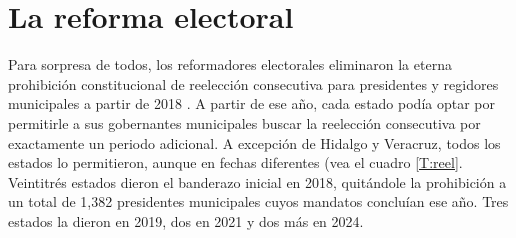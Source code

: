 \documentclass[letter,12pt]{article}
\begin{document}
\section{La reforma electoral} 

Para sorpresa de todos, los reformadores electorales eliminaron la eterna prohibición constitucional de reelección consecutiva para presidentes y regidores municipales a partir de 2018 \citep{magar.el.dataset.2026}. A partir de ese año, cada estado podía optar por permitirle a sus gobernantes municipales buscar la reelección consecutiva por exactamente un periodo adicional. A excepción de Hidalgo y Veracruz, todos los estados lo permitieron, aunque en fechas diferentes (vea el cuadro \ref{T:reel}. Veintitrés estados dieron el banderazo inicial en 2018, quitándole la prohibición a un total de 1,382 presidentes municipales cuyos mandatos concluían ese año. Tres estados la dieron en 2019, dos en 2021 y dos más en 2024. 

\end{document}

